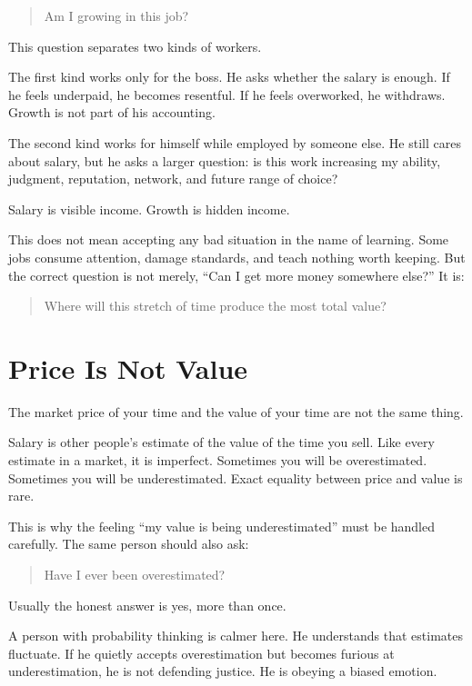 \begin{quote}
Am I growing in this job?
\end{quote}

This question separates two kinds of workers.

The first kind works only for the boss. He asks whether the salary is enough. If he feels underpaid, he becomes resentful. If he feels overworked, he withdraws. Growth is not part of his accounting.

The second kind works for himself while employed by someone else. He still cares about salary, but he asks a larger question: is this work increasing my ability, judgment, reputation, network, and future range of choice?

Salary is visible income. Growth is hidden income.

This does not mean accepting any bad situation in the name of learning. Some jobs consume attention, damage standards, and teach nothing worth keeping. But the correct question is not merely, ``Can I get more money somewhere else?'' It is:

\begin{quote}
Where will this stretch of time produce the most total value?
\end{quote}

\section*{Price Is Not Value}

The market price of your time and the value of your time are not the same thing.

Salary is other people's estimate of the value of the time you sell. Like every estimate in a market, it is imperfect. Sometimes you will be overestimated. Sometimes you will be underestimated. Exact equality between price and value is rare.

This is why the feeling ``my value is being underestimated'' must be handled carefully. The same person should also ask:

\begin{quote}
Have I ever been overestimated?
\end{quote}

Usually the honest answer is yes, more than once.

A person with probability thinking is calmer here. He understands that estimates fluctuate. If he quietly accepts overestimation but becomes furious at underestimation, he is not defending justice. He is obeying a biased emotion.

